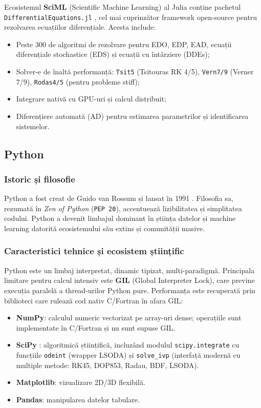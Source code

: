 Ecosistemul \textbf{SciML} (Scientific Machine Learning) al Julia conține
pachetul \texttt{DifferentialEquations.jl} \cite{rackauckas2017diffeq}, cel
mai cuprinzător framework open-source pentru rezolvarea ecuațiilor diferențiale.
Acesta include:
\begin{itemize}
    \item Peste 300 de algoritmi de rezolvare pentru EDO, EDP, EAD,
    ecuații diferențiale stochastice (EDS) și ecuații cu întârziere (DDEs);
    \item Solver-e de înaltă performanță: \texttt{Tsit5} (Tsitouras RK 4/5),
    \texttt{Vern7/9} (Verner 7/9), \texttt{Rodas4/5} (pentru probleme stiff);
    \item Integrare nativă cu GPU-uri și calcul distribuit;
    \item Diferențiere automată (AD) pentru estimarea parametrilor și
    identificarea sistemelor.
\end{itemize}

\subsection{Python}
\label{subsec:python}

\subsubsection{Istoric și filosofie}

Python a fost creat de Guido van Rossum și lansat în 1991 \cite{vanrossum2009python}.
Filosofia sa, rezumată în \emph{Zen of Python} (\texttt{PEP 20}), accentuează
lizibilitatea și simplitatea codului. Python a devenit limbajul dominant în
știința datelor și machine learning datorită ecosistemului său extins și
comunității masive.

\subsubsection{Caracteristici tehnice și ecosistem științific}

Python este un limbaj interpretat, dinamic tipizat, multi-paradigmă. Principala
limitare pentru calcul intensiv este \textbf{GIL} (Global Interpreter Lock),
care previne execuția paralelă a thread-urilor Python pure. Performanța este
recuperată prin biblioteci care rulează cod nativ C/Fortran în afara GIL:

\begin{itemize}
    \item \textbf{NumPy}: calculul numeric vectorizat pe array-uri dense;
    operațiile sunt implementate în C/Fortran și nu sunt supuse GIL.
    \item \textbf{SciPy} \cite{virtanen2020scipy}: algoritmică științifică,
    incluzând modulul \texttt{scipy.integrate} cu funcțiile \texttt{odeint}
    (wrapper LSODA) și \texttt{solve\_ivp} (interfață modernă cu multiple
    metode: RK45, DOP853, Radau, BDF, LSODA).
    \item \textbf{Matplotlib}: vizualizare 2D/3D flexibilă.
    \item \textbf{Pandas}: manipularea datelor tabulare.
\end{itemize}

